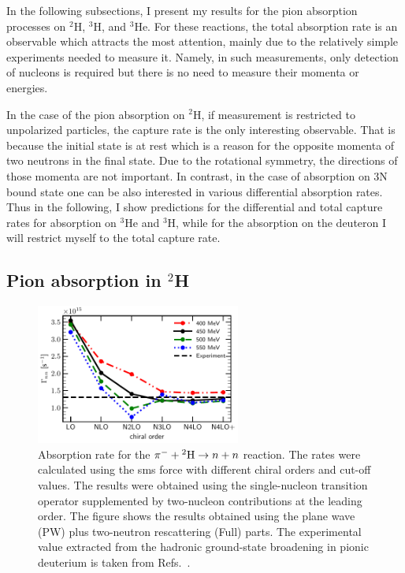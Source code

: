 In the following subsections, I present my results for the pion absorption processes
on $^2$H, $^3$H, and $^3$He. For these reactions, the total absorption rate is an observable
which attracts the most attention, mainly due to the relatively simple experiments needed to measure it.
Namely, in such measurements, only detection of nucleons is required
but there is no need to measure their momenta or energies.

In the case of the pion absorption on $^2$H, if measurement is restricted to unpolarized particles,
the capture rate is the only interesting observable.
That is because the initial state is at rest which is a reason for the opposite momenta of two neutrons in the final
state.
Due to the rotational symmetry, the directions of those momenta are not important.
In contrast, in the case of absorption on 3N bound state one can be also interested in various
differential absorption rates.
Thus in the following, I show predictions for the differential and total capture rates
for absorption on $^3$He and $^3$H, while for the absorption on the deuteron I will restrict myself to the 
total capture rate.

\subsection{Pion absorption in $^2$H}


\begin{figure}[h]
        \begin{center}
        \includegraphics[width=0.6\textwidth]{PlotData/PION/Dalitz_maps/figures/Gamma_nn.pdf}
        \end{center}
        \caption{
            Absorption rate for the $\pi^- + {^2{\rm H}} \rightarrow n + n$ reaction.
            The rates were calculated using the \gls{sms} force with different chiral orders and cut-off values.
            The results were obtained using the single-nucleon transition operator 
            supplemented by two-nucleon contributions at the leading order.
            The figure shows the results obtained using the plane wave (PW) plus
            two-neutron rescattering (Full) parts.
            The experimental value extracted from the hadronic
            ground-state broadening in pionic deuterium is taken from Refs.~\cite{Strauch2010,Strauch2011}.}
        \label{Gamma_nn}
    \end{figure}

